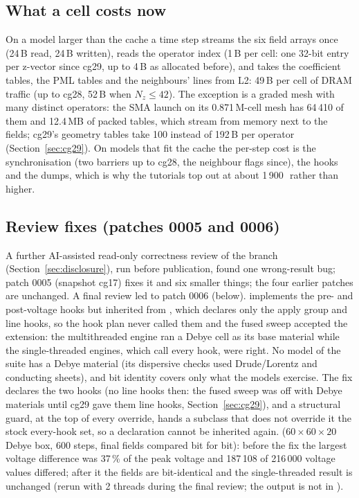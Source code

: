 \subsection{What a cell costs now}
On a model larger than the cache a time step streams the six field arrays once (24\,B read, 24\,B written), reads the
operator index (1\,B per cell: one 32-bit entry per z-vector since cg29, up to 4\,B as allocated before), and takes
the coefficient tables, the PML tables and the neighbours' lines from L2: 49\,B per cell of DRAM traffic (up to cg28,
52\,B when $N_z \le 42$). The exception is a graded mesh with many distinct operators: the SMA launch on its
0.871\,M-cell mesh has 64\,410 of them and 12.4\,MB of packed tables, which stream from memory next to the fields;
cg29's geometry tables take 100 instead of 192\,B per operator (Section~\ref{sec:cg29}). On models that fit the cache
the per-step cost is the synchronisation (two barriers up to cg28, the neighbour flags since), the hooks and the
dumps, which is why the tutorials top out at about 1\,900\,\MC\ rather than higher.

\subsection{Review fixes (patches 0005 and 0006)}\label{sec:reviewfixes}
A further AI-assisted read-only correctness review of the branch (Section~\ref{sec:disclosure}), run before
publication, found one wrong-result bug; patch 0005 (snapshot cg17) fixes it and six smaller things; the four earlier
patches are unchanged. A final review led to patch 0006 (below).
 implements the pre- and post-voltage hooks but inherited  from
, which declares only the apply group and line hooks, so the hook plan never called them
and the fused sweep accepted the extension: the multithreaded engine ran a Debye cell as its base material while the
single-threaded engines, which call every hook, were right. No model of the suite has a Debye material (its dispersive
checks used Drude/Lorentz and conducting sheets), and bit identity covers only what the models exercise. The fix
declares the two hooks (no line hooks then: the fused sweep was off with Debye materials until cg29 gave them line
hooks, Section~\ref{sec:cg29}), and a structural guard,
 at the top of every  override, hands a subclass that does not
override it the stock every-hook set, so a declaration cannot be inherited again. 
($60\times60\times20$ Debye box, 600 steps, final fields compared bit for bit): before the fix the largest voltage
difference was 37\,\% of the peak voltage and 187\,108 of 216\,000 voltage values differed; after it the fields are
bit-identical and the single-threaded result is unchanged (rerun with 2 threads during the final review; the output
is not in ).

